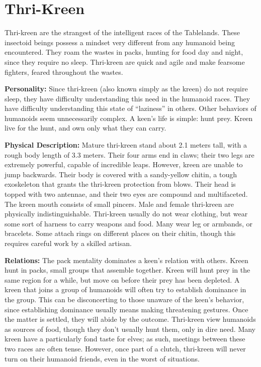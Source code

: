 \section{Thri-Kreen}


Thri-kreen are the strangest of the intelligent races of the Tablelands. These insectoid beings possess a mindset very different from any humanoid being encountered. They roam the wastes in packs, hunting for food day and night, since they require no sleep. Thri-kreen are quick and agile and make fearsome fighters, feared throughout the wastes.

\textbf{Personality:} Since thri-kreen (also known simply as the kreen) do not require sleep, they have difficulty understanding this need in the humanoid races. They have difficulty understanding this state of ``laziness'' in others. Other behaviors of humanoids seem unnecessarily complex. A keen's life is simple: hunt prey. Kreen live for the hunt, and own only what they can carry.

\textbf{Physical Description:} Mature thri-kreen stand about 2.1 meters tall, with a rough body length of 3.3 meters. Their four arms end in claws; their two legs are extremely powerful, capable of incredible leaps. However, kreen are unable to jump backwards. Their body is covered with a sandy-yellow chitin, a tough exoskeleton that grants the thri-kreen protection from blows. Their head is topped with two antennae, and their two eyes are compound and multifaceted. The kreen mouth consists of small pincers. Male and female thri-kreen are physically indistinguishable. Thri-kreen usually do not wear clothing, but wear some sort of harness to carry weapons and food. Many wear leg or armbands, or bracelets. Some attach rings on different places on their chitin, though this requires careful work by a skilled artisan.

\textbf{Relations:} The pack mentality dominates a keen's relation with others. Kreen hunt in packs, small groups that assemble together. Kreen will hunt prey in the same region for a while, but move on before their prey has been depleted. A kreen that joins a group of humanoids will often try to establish dominance in the group. This can be disconcerting to those unaware of the keen's behavior, since establishing dominance usually means making threatening gestures. Once the matter is settled, they will abide by the outcome. Thri-kreen view humanoids as sources of food, though they don't usually hunt them, only in dire need. Many kreen have a particularly fond taste for elves; as such, meetings between these two races are often tense. However, once part of a clutch, thri-kreen will never turn on their humanoid friends, even in the worst of situations.

